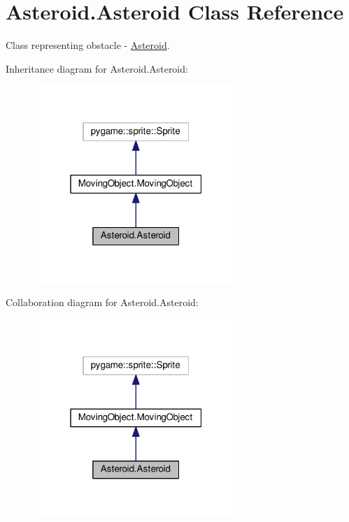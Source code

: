 \hypertarget{classAsteroid_1_1Asteroid}{}\section{Asteroid.\+Asteroid Class Reference}
\label{classAsteroid_1_1Asteroid}


Class representing obstacle -\/ \hyperlink{classAsteroid_1_1Asteroid}{Asteroid}.  




Inheritance diagram for Asteroid.\+Asteroid\+:\nopagebreak
\begin{figure}[H]
\begin{center}
\leavevmode
\includegraphics[width=220pt]{classAsteroid_1_1Asteroid__inherit__graph}
\end{center}
\end{figure}


Collaboration diagram for Asteroid.\+Asteroid\+:\nopagebreak
\begin{figure}[H]
\begin{center}
\leavevmode
\includegraphics[width=220pt]{classAsteroid_1_1Asteroid__coll__graph}
\end{center}
\end{figure}
